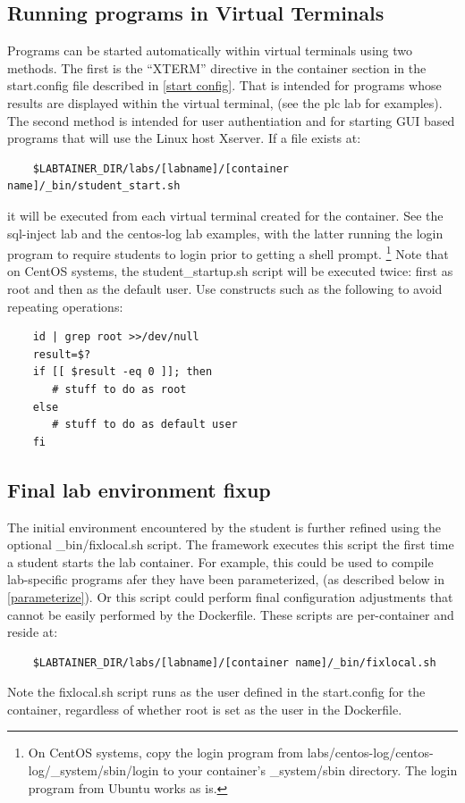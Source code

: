 \documentclass[12pt]{article}
\begin{document}
\subsection {Running programs in Virtual Terminals}
\label {student start}
Programs can be started automatically within virtual terminals using two methods.
The first is the ``XTERM'' directive in the container section in the start.config file
described in \ref{start config}.  That is intended for programs whose results are displayed
within the virtual terminal, (see the plc lab for examples).  The second method is 
intended for user authentiation and for starting GUI based programs
that will use the Linux host Xserver.  If a file exists at:
\begin{verbatim}
    $LABTAINER_DIR/labs/[labname]/[container name]/_bin/student_start.sh
\end{verbatim}
it will be executed from each virtual terminal created for the container.
See the sql-inject lab and the centos-log lab examples, with the latter
running the login program to require students to login prior to getting a shell prompt.
\footnote{On CentOS systems, copy the login program from labs/centos-log/centos-log/\_system/sbin/login
to your container's \_system/sbin directory. The login program from Ubuntu works as is.}
Note that on CentOS systems, the student\_startup.sh script will be executed twice: first
as root and then as the default user.  Use constructs such as the following to avoid repeating
operations:
\begin{verbatim}
    id | grep root >>/dev/null
    result=$?
    if [[ $result -eq 0 ]]; then
       # stuff to do as root
    else
       # stuff to do as default user
    fi
\end{verbatim}


\subsection{Final lab environment fixup}
The initial environment encountered by the student is further refined using
the optional \_bin/fixlocal.sh script.  The framework executes
this script the first time a student starts the lab container.  For example,
this could be used to compile lab-specific programs afer they have been parameterized,
(as described below in \ref{parameterize}).  Or this script could perform final configuration adjustments
that cannot be easily performed by the Dockerfile.  These scripts are per-container
and reside at:
\begin{verbatim}
    $LABTAINER_DIR/labs/[labname]/[container name]/_bin/fixlocal.sh
\end{verbatim}
\noindent Note the fixlocal.sh script runs as the user defined in the start.config for the container, 
regardless of whether root is set as the user in the Dockerfile.
\end{document}

